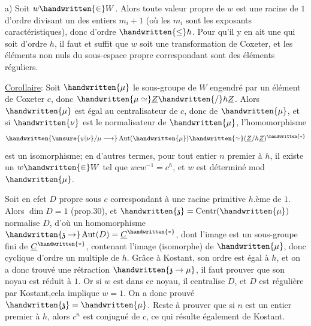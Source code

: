 a) Soit $w\handwritten{\in}W$. Alors toute valeur propre de $w$ est une racine de $1$ d'ordre divisant un des entiers $m_i+1$ (où les $m_i$ sont les exposants caractéristiques), donc d'ordre $\handwritten{\leq}h$. Pour qu'il y en ait une qui soit d'ordre $h$, il faut et suffit que $w$ soit une transformation de Coxeter, et les éléments non nuls du sous-espace propre correspondant sont des éléments réguliers.

\uline{Corollaire}: Soit $\handwritten{\mu}$ le sous-groupe de $W$ engendré par un élément de Coxeter $c$, donc $\handwritten{\mu\simeq}\underline{Z}\handwritten{/}h\underline{Z}$. Alors $\handwritten{\mu}$ est égal au centralisateur de $c$, donc de $\handwritten{\mu}$, et si $\handwritten{\nu}$ est le normalisateur de $\handwritten{\mu}$, l'homomorphisme
\[
\handwritten{\unsure{\psi|\nu}/\mu\longrightarrow}\operatorname{Aut}(\handwritten{\mu})\handwritten{\simeq}(\underline{Z}/h\underline{Z})^{\handwritten{*}}
\]
\margin{\handwritten{Quelle extension de $(\unsure{Z|\mathbb{Z}}/hZ]^{*}$ par $Z/hZ$ obtient-on ?}}
est un isomorphisme; en d'autres termes, pour tout entier $n$ premier à $h$, il existe un $w\handwritten{\in}W$ tel que $wcw^{-1}=c^h$, et $w$ est déterminé mod $\handwritten{\mu}$.

Soit en efet $D$  propre sous $c$ correspondant à une racine primitive $h$.ème de $1$. Alors $\dim D=1$ (prop.30), et $\handwritten{\mathfrak{z}}=\operatorname{Centr}(\handwritten{\mu})$ normalise $D$, d'où un homomorphisme $\handwritten{\mathfrak{z}\to}\operatorname{Aut}(D)=\underline{C}^{\handwritten{*}}$, dont l'image est un sous-groupe fini de $\underline{C}^{\handwritten{*}}$, contenant l'image (isomorphe) de $\handwritten{\mu}$, donc cyclique d'ordre un multiple de $h$. Grâce à Kostant, son ordre est égal à $h$, et on a donc trouvé une rétraction $\handwritten{\mathfrak{z}\to\mu}$, il faut prouver que son noyau est réduit à $1$. Or si $w$ est dans ce noyau, il  centralise $D$, et  $D$ est régulière par Kostant,cela implique $w=1$. On a donc prouvé $\handwritten{\mathfrak{z}}=\handwritten{\mu}$. Reste à prouver que si $n$ est un entier premier à $h$, alors $c^n$ est conjugué de $c$, ce qui résulte également de Kostant.

